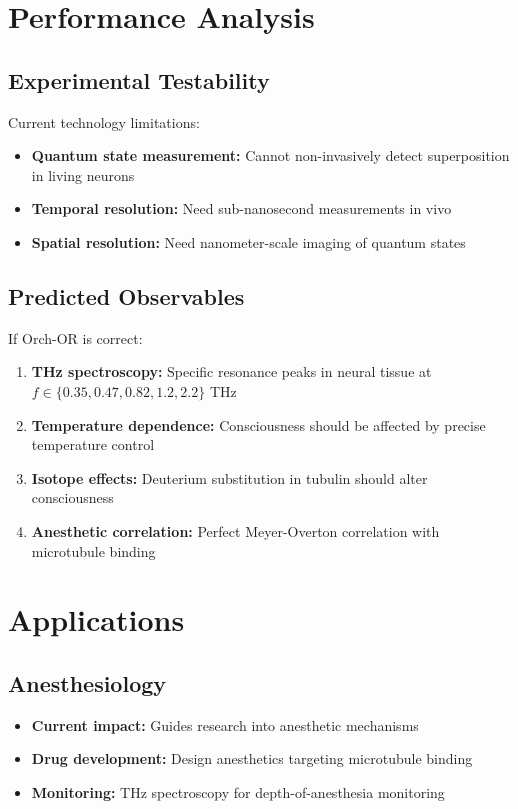 \section{Performance Analysis}

\subsection{Experimental Testability}

Current technology limitations:
\begin{itemize}
\item \textbf{Quantum state measurement:} Cannot non-invasively detect superposition in living neurons
\item \textbf{Temporal resolution:} Need sub-nanosecond measurements in vivo
\item \textbf{Spatial resolution:} Need nanometer-scale imaging of quantum states
\end{itemize}

\subsection{Predicted Observables}

If Orch-OR is correct:
\begin{enumerate}
\item \textbf{THz spectroscopy:} Specific resonance peaks in neural tissue at $f \in \{0.35, 0.47, 0.82, 1.2, 2.2\}$ THz
\item \textbf{Temperature dependence:} Consciousness should be affected by precise temperature control
\item \textbf{Isotope effects:} Deuterium substitution in tubulin should alter consciousness
\item \textbf{Anesthetic correlation:} Perfect Meyer-Overton correlation with microtubule binding
\end{enumerate}

\section{Applications}

\subsection{Anesthesiology}

\begin{itemize}
\item \textbf{Current impact:} Guides research into anesthetic mechanisms
\item \textbf{Drug development:} Design anesthetics targeting microtubule binding
\item \textbf{Monitoring:} THz spectroscopy for depth-of-anesthesia monitoring
\end{itemize}

